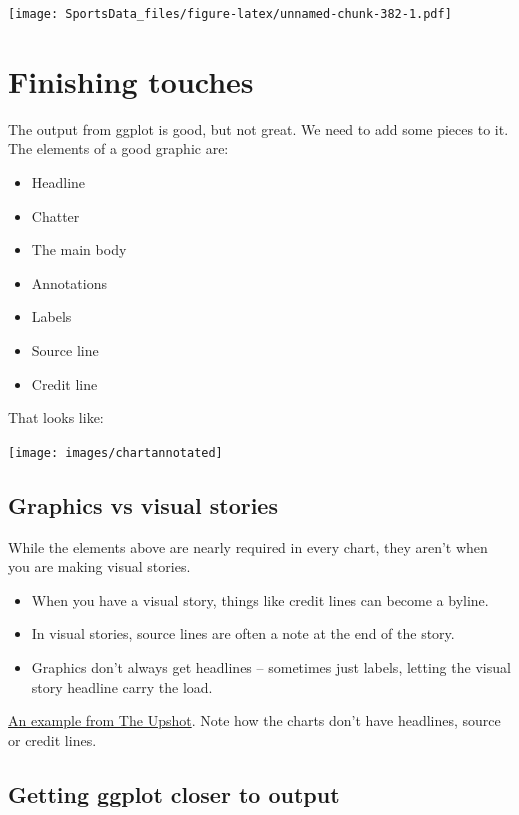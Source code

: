 \documentclass[
]{book}
\providecommand{\tightlist}{%
  \setlength{\itemsep}{0pt}\setlength{\parskip}{0pt}}
\begin{document}
\texttt{[image: SportsData\_files/figure-latex/unnamed-chunk-382-1.pdf]}

\hypertarget{finishing-touches}{%
\chapter{Finishing touches}\label{finishing-touches}}

The output from ggplot is good, but not great. We need to add some pieces to it. The elements of a good graphic are:

\begin{itemize}
\tightlist
\item
  Headline
\item
  Chatter
\item
  The main body
\item
  Annotations
\item
  Labels
\item
  Source line
\item
  Credit line
\end{itemize}

That looks like:

\texttt{[image: images/chartannotated]}

\hypertarget{graphics-vs-visual-stories}{%
\section{Graphics vs visual stories}\label{graphics-vs-visual-stories}}

While the elements above are nearly required in every chart, they aren't when you are making visual stories.

\begin{itemize}
\tightlist
\item
  When you have a visual story, things like credit lines can become a byline.
\item
  In visual stories, source lines are often a note at the end of the story.
\item
  Graphics don't always get headlines -- sometimes just labels, letting the visual story headline carry the load.
\end{itemize}

\href{https://www.nytimes.com/interactive/2018/02/14/business/economy/inflation-prices.html}{An example from The Upshot}. Note how the charts don't have headlines, source or credit lines.

\hypertarget{getting-ggplot-closer-to-output}{%
\section{Getting ggplot closer to output}\label{getting-ggplot-closer-to-output}}
\end{document}
